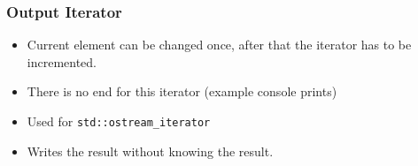 \subsubsection{Output Iterator}
\begin{itemize}
  \itemsep -0.5em 
  \item Current element can be changed once, after that the iterator has to be incremented.
  \item There is no end for this iterator (example console prints)
  \item Used for \lstinline|std::ostream_iterator|
  \item Writes the result without knowing the result.
\end{itemize}